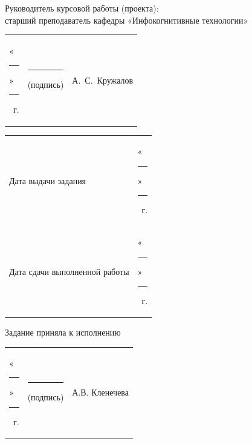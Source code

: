 \documentclass[14pt, a4paper]{extarticle}
\begin{document}

Руководитель курсовой работы (проекта): \\ старший преподаватель кафедры
«Инфокогнитивные технологии»

{
\renewcommand{\arraystretch}{2}
\noindent
\begin{tabularx}{\textwidth}{@{} P{0.45\textwidth} P{0.3\textwidth} P{0.25\textwidth} @{}}

    «\rule{0.8cm}{0.4pt}» \quad \rule{2cm}{0.4pt} ~г. &
    \centering \rule{3.5cm}{0.4pt} \par \footnotesize (подпись) &
    \hfill А.~С.~Кружалов                                         \\
\end{tabularx}

\begin{tabularx}{\textwidth}{@{} P{0.45\textwidth} P{0.55\textwidth} @{}}
    Дата выдачи задания           &
    \hfill «\rule{0.8cm}{0.4pt}» \quad \rule{2cm}{0.4pt} ~г. \\

    Дата сдачи выполненной работы &
    \hfill «\rule{0.8cm}{0.4pt}» \quad \rule{2cm}{0.4pt} ~г. \\
\end{tabularx}
}

Задание приняла к исполнению

{
\renewcommand{\arraystretch}{1.5}
\begin{tabularx}{\textwidth}{@{} P{0.45\textwidth} P{0.3\textwidth} P{0.25\textwidth} @{}}

    «\rule{0.8cm}{0.4pt}» \quad \rule{2cm}{0.4pt} ~г. &
    \centering \rule{3.5cm}{0.4pt} \par \footnotesize (подпись) &
    \hfill А.В. Кленечева                                            \\
\end{tabularx}
}
\end{document}
